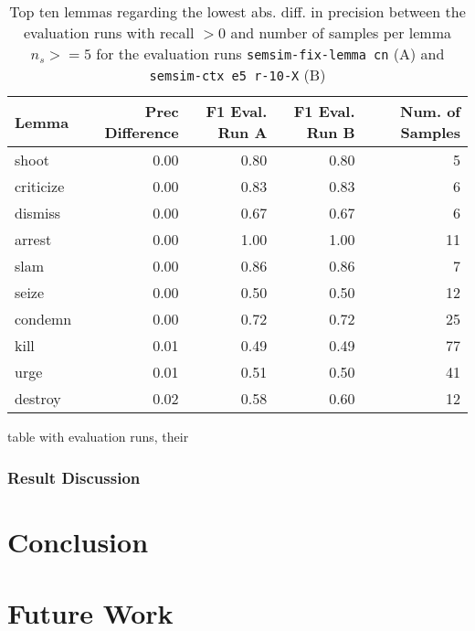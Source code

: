 \documentclass[11pt]{scrreprt}
\begin{document}
\begin{table}[ht]
\centering
\begin{tabular}{lrrrr}
\toprule
Lemma      & Prec Difference & F1 Eval. Run A & F1 Eval. Run B & Num. of Samples \\
\midrule
shoot      & 0.00          & 0.80           & 0.80           & 5               \\
criticize  & 0.00          & 0.83           & 0.83           & 6               \\
dismiss    & 0.00          & 0.67           & 0.67           & 6               \\
arrest     & 0.00          & 1.00           & 1.00           & 11              \\
slam       & 0.00          & 0.86           & 0.86           & 7               \\
seize      & 0.00          & 0.50           & 0.50           & 12              \\
condemn    & 0.00          & 0.72           & 0.72           & 25              \\
kill       & 0.01          & 0.49           & 0.49           & 77              \\
urge       & 0.01          & 0.51           & 0.50           & 41              \\
destroy    & 0.02          & 0.58           & 0.60           & 12              \\
\bottomrule
\end{tabular}
\caption{Top ten lemmas regarding the lowest abs. diff. in precision between the evaluation runs with recall \(> 0\) and number of samples per lemma \(n_s >= 5\) for the evaluation runs \texttt{semsim-fix-lemma cn} (A) and \texttt{semsim-ctx e5 r-10-X} (B)}
\end{table}



table with evaluation runs, their 


\subsection{Result Discussion}


\chapter{Conclusion}

\chapter{Future Work}
\end{document}

